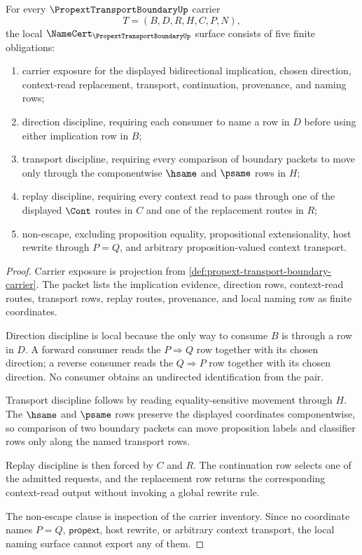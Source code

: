 \begin{theorem}
\label{thm:propext-transport-boundary-namecert-obligations}
For every $\PropextTransportBoundaryUp$ carrier
$$
T=(B,D,R,H,C,P,N),
$$
the local $\NameCert_{\PropextTransportBoundaryUp}$ surface consists of five finite obligations:
\begin{enumerate}
\item carrier exposure for the displayed bidirectional implication, chosen direction, context-read replacement, transport, continuation, provenance, and naming rows;
\item direction discipline, requiring each consumer to name a row in $D$ before using either implication row in $B$;
\item transport discipline, requiring every comparison of boundary packets to move only through the componentwise $\hsame$ and $\psame$ rows in $H$;
\item replay discipline, requiring every context read to pass through one of the displayed $\Cont$ routes in $C$ and one of the replacement routes in $R$;
\item non-escape, excluding proposition equality, propositional extensionality, host rewrite through $P=Q$, and arbitrary proposition-valued context transport.
\end{enumerate}
\end{theorem}
\begin{proof}
Carrier exposure is projection from \autoref{def:propext-transport-boundary-carrier}. The packet lists the implication evidence, direction rows, context-read routes, transport rows, replay routes, provenance, and local naming row as finite coordinates.

Direction discipline is local because the only way to consume $B$ is through a row in $D$. A forward consumer reads the $P\Rightarrow Q$ row together with its chosen direction; a reverse consumer reads the $Q\Rightarrow P$ row together with its chosen direction. No consumer obtains an undirected identification from the pair.

Transport discipline follows by reading equality-sensitive movement through $H$. The $\hsame$ and $\psame$ rows preserve the displayed coordinates componentwise, so comparison of two boundary packets can move proposition labels and classifier rows only along the named transport rows.

Replay discipline is then forced by $C$ and $R$. The continuation row selects one of the admitted requests, and the replacement row returns the corresponding context-read output without invoking a global rewrite rule.

The non-escape clause is inspection of the carrier inventory. Since no coordinate names $P=Q$, $\mathsf{propext}$, host rewrite, or arbitrary context transport, the local naming surface cannot export any of them.
\end{proof}

